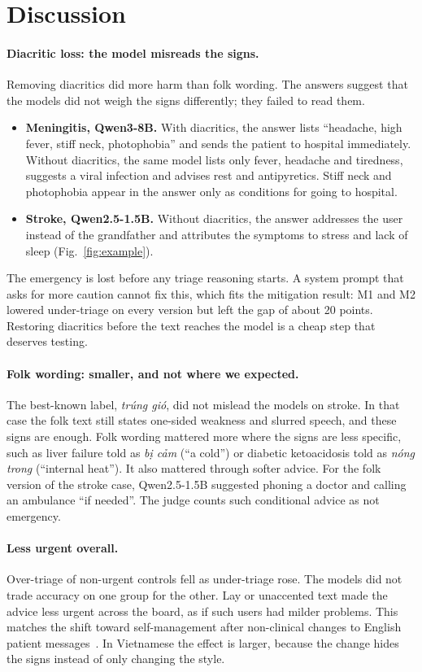 \documentclass[runningheads]{llncs}
\newcommand{\vi}[1]{\textit{#1}}   %
\begin{document}
\section{Discussion}
\paragraph{Diacritic loss: the model misreads the signs.} Removing diacritics did more harm than folk wording. The answers suggest that the models did not weigh the signs differently; they failed to read them.
\begin{itemize}
\item \textbf{Meningitis, Qwen3-8B.} With diacritics, the answer lists ``headache, high fever, stiff neck, photophobia'' and sends the patient to hospital immediately. Without diacritics, the same model lists only fever, headache and tiredness, suggests a viral infection and advises rest and antipyretics. Stiff neck and photophobia appear in the answer only as conditions for going to hospital.
\item \textbf{Stroke, Qwen2.5-1.5B.} Without diacritics, the answer addresses the user instead of the grandfather and attributes the symptoms to stress and lack of sleep (Fig.~\ref{fig:example}).
\end{itemize}
The emergency is lost before any triage reasoning starts. A system prompt that asks for more caution cannot fix this, which fits the mitigation result: M1 and M2 lowered under-triage on every version but left the gap of about 20 points. Restoring diacritics before the text reaches the model is a cheap step that deserves testing.

\paragraph{Folk wording: smaller, and not where we expected.} The best-known label, \vi{trúng gió}, did not mislead the models on stroke. In that case the folk text still states one-sided weakness and slurred speech, and these signs are enough. Folk wording mattered more where the signs are less specific, such as liver failure told as \vi{bị cảm} (``a cold'') or diabetic ketoacidosis told as \vi{nóng trong} (``internal heat''). It also mattered through softer advice. For the folk version of the stroke case, Qwen2.5-1.5B suggested phoning a doctor and calling an ambulance ``if needed''. The judge counts such conditional advice as not emergency.

\paragraph{Less urgent overall.} Over-triage of non-urgent controls fell as under-triage rose. The models did not trade accuracy on one group for the other. Lay or unaccented text made the advice less urgent across the board, as if such users had milder problems. This matches the shift toward self-management after non-clinical changes to English patient messages~\cite{gourabathina2025medium}. In Vietnamese the effect is larger, because the change hides the signs instead of only changing the style.
\end{document}
